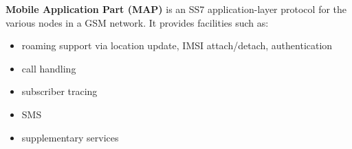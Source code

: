 \textbf{Mobile Application Part (MAP)} is an SS7 application-layer protocol for the various nodes in a GSM network.
 It provides facilities such as:
  \begin{itemize}[noitemsep,topsep=0pt,parsep=0pt,partopsep=0pt]
   \item roaming support via location update, IMSI attach/detach, authentication
   \item call handling
   \item subscriber tracing
   \item SMS
   \item supplementary services
  \end{itemize}



